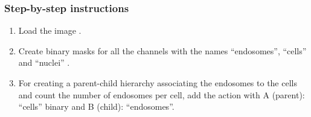 \subsubsection*{Step-by-step instructions}

\begin{enumerate}
    \item Load the image .

    \item Create binary masks for all the channels with the names ``endosomes'', ``cells'' and ``nuclei'' 
    . 

    \item For creating a parent-child hierarchy associating the endosomes to the cells and count the number of endosomes per cell, add the action  with A (parent): ``cells'' binary and B (child): ``endosomes''. 




\end{enumerate}
